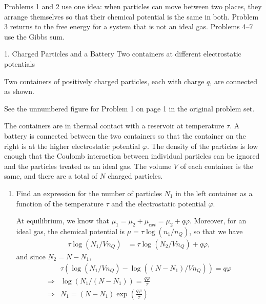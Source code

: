 \documentclass[11pt]{article}
\begin{document}
Problems 1 and 2 use one idea: when particles can move between two places, they arrange themselves so that their chemical potential is the same in both.
Problem 3 returns to the free energy for a system that is not an ideal gas.
Problems 4--7 use the Gibbs sum.

\begin{problem}{1. Charged Particles and a Battery}
Two containers at different electrostatic potentials

Two containers of positively charged particles, each with charge \(q\), are connected as shown.

See the unnumbered figure for Problem 1 on page 1 in the original problem set.

The containers are in thermal contact with a reservoir at temperature \(\tau\).
A battery is connected between the two containers so that the container on the right is at the higher electrostatic potential \(\varphi\).
The density of the particles is low enough that the Coulomb interaction between individual particles can be ignored and the particles treated as an ideal gas.
The volume \(V\) of each container is the same, and there are a total of \(N\) charged particles.
\begin{enumerate}[label=(\alph*)]
  \item Find an expression for the number of particles \(N_1\) in the left container as a function of the temperature \(\tau\) and the electrostatic potential \(\varphi\).
        \begin{answer}
          At equilibrium, we know that \(\mu_1 = \mu_2 + \mu_{ext} = \mu_2 + q\varphi\).
          Moreover, for an ideal gas, the chemical potential is \(\mu = \tau\log(n_1/n_{Q})\), so that we have
          \begin{equation}
            \label{eq:1}
            \begin{aligned}
          \tau\log(N_1/Vn_Q) &= \tau\log(N_2/Vn_Q) + q\varphi,
            \end{aligned}
          \end{equation}
          and since \( N_2 = N - N_1 \),
          \begin{equation}
          \label{eq:2}
          \begin{aligned}
            &\tau(\log(N_1/Vn_Q) - \log((N-N_1)/Vn_Q)) = q\varphi \\
            \Rightarrow & \log(N_1/(N-N_1)) = \frac{q\varphi}{\tau} \\
            \Rightarrow & N_1 = (N-N_{1})\exp(\frac{q\varphi}{\tau}) \\

\end{aligned}
\end{equation}
\end{answer}
\end{enumerate}
\end{problem}
\end{document}
